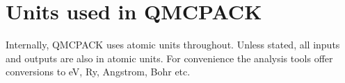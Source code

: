 \chapter{Units used in QMCPACK}
Internally, QMCPACK uses atomic units throughout. Unless stated, all inputs and outputs are also in atomic units. For convenience the analysis tools offer conversions to eV, Ry, Angstrom, Bohr etc.


